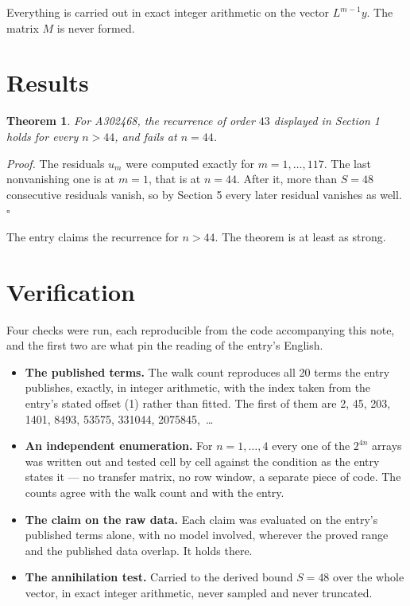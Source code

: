 \documentclass[11pt]{article}
\newtheorem{theorem}{Theorem}
\theoremstyle{definition}
\begin{document}
Everything is carried out in exact integer arithmetic on the vector $L^{m-1}y$. The matrix $M$ is never formed.

\section{Results}

\begin{theorem} For A302468, the recurrence of order $43$ displayed in Section 1 holds for every $n > 44$, and fails at $n = 44$.\end{theorem}

{\itshape Proof.} The residuals $u_m$ were computed exactly for $m = 1,\dots,117$. The last nonvanishing one is at $m = 1$, that is at $n = 44$. After it, more than $S = 48$ consecutive residuals vanish, so by Section 5 every later residual vanishes as well. $\square$

The entry claims the recurrence for $n > 44$. The theorem is at least as strong.

\section{Verification}

Four checks were run, each reproducible from the code accompanying this note, and the first two are what pin the reading of the entry's English.

\begin{itemize}

\item {\bfseries The published terms.} The walk count reproduces all 20 terms the entry publishes, exactly, in integer arithmetic, with the index taken from the entry's stated offset (1) rather than fitted. The first of them are 2, 45, 203, 1401, 8493, 53575, 331044, 2075845,~\dots

\item {\bfseries An independent enumeration.} For $n = 1,\dots,4$ every one of the $2^{4n}$ arrays was written out and tested cell by cell against the condition as the entry states it --- no transfer matrix, no row window, a separate piece of code. The counts agree with the walk count and with the entry.

\item {\bfseries The claim on the raw data.} Each claim was evaluated on the entry's published terms alone, with no model involved, wherever the proved range and the published data overlap. It holds there.

\item {\bfseries The annihilation test.} Carried to the derived bound $S = 48$ over the whole vector, in exact integer arithmetic, never sampled and never truncated.

\end{itemize}
\end{document}
